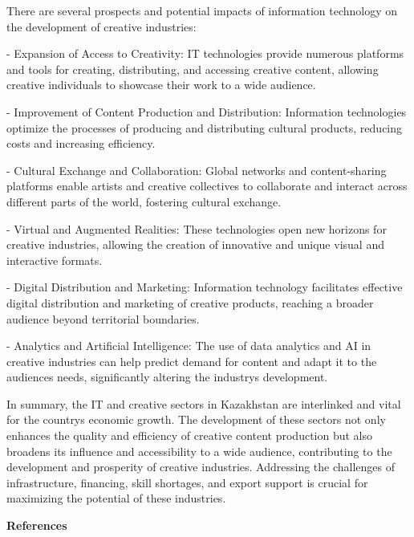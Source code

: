 \begin{multicols}{2}
There are several prospects and potential impacts of information
technology on the development of creative industries:

- Expansion of Access to Creativity: IT technologies provide numerous
platforms and tools for creating, distributing, and accessing creative
content, allowing creative individuals to showcase their work to a wide
audience.

- Improvement of Content Production and Distribution: Information
technologies optimize the processes of producing and distributing
cultural products, reducing costs and increasing efficiency.

- Cultural Exchange and Collaboration: Global networks and
content-sharing platforms enable artists and creative collectives to
collaborate and interact across different parts of the world, fostering
cultural exchange.

- Virtual and Augmented Realities: These technologies open new horizons
for creative industries, allowing the creation of innovative and unique
visual and interactive formats.

- Digital Distribution and Marketing: Information technology facilitates
effective digital distribution and marketing of creative products,
reaching a broader audience beyond territorial boundaries.

- Analytics and Artificial Intelligence: The use of data analytics and
AI in creative industries can help predict demand for content and adapt
it to the audience\textquotesingle s needs, significantly altering the
industry\textquotesingle s development.

In summary, the IT and creative sectors in Kazakhstan are interlinked
and vital for the country\textquotesingle s economic growth. The
development of these sectors not only enhances the quality and
efficiency of creative content production but also broadens its
influence and accessibility to a wide audience, contributing to the
development and prosperity of creative industries. Addressing the
challenges of infrastructure, financing, skill shortages, and export
support is crucial for maximizing the potential of these industries.
\end{multicols}

\begin{center}
{\bfseries References}
\end{center}

